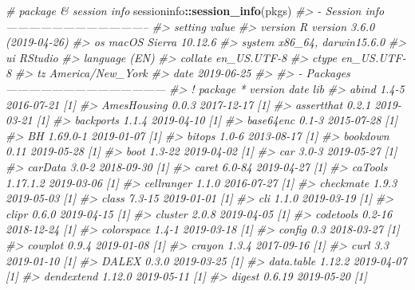 \documentclass[]{krantz}
\makeatletter
\newenvironment{Shaded}{\begin{snugshade}}{\end{snugshade}}
\newcommand{\CommentTok}[1]{\textcolor[rgb]{0.37,0.37,0.37}{\textit{#1}}}
\newcommand{\KeywordTok}[1]{\textcolor[rgb]{0.27,0.27,0.27}{\textbf{#1}}}
\newcommand{\NormalTok}[1]{#1}
\newcommand{\OperatorTok}[1]{\textcolor[rgb]{0.43,0.43,0.43}{\textbf{#1}}}
\newenvironment{kframe}{%
\medskip{}
\setlength{\fboxsep}{.8em}
 \def\at@end@of@kframe{}%
 \ifinner\ifhmode%
  \def\at@end@of@kframe{\end{minipage}}%
  \begin{minipage}{\columnwidth}%
 \fi\fi%
 \def\FrameCommand##1{\hskip\@totalleftmargin \hskip-\fboxsep
 \colorbox{shadecolor}{##1}\hskip-\fboxsep
     \hskip-\linewidth \hskip-\@totalleftmargin \hskip\columnwidth}%
 \MakeFramed {\advance\hsize-\width
   \@totalleftmargin\z@ \linewidth\hsize
   \@setminipage}}%
 {\par\unskip\endMakeFramed%
 \at@end@of@kframe}
\renewenvironment{Shaded}{\begin{kframe}}{\end{kframe}}
\makeatother
\begin{document}
\begin{Shaded}
\begin{Highlighting}[]
\CommentTok{# package & session info}
\NormalTok{sessioninfo}\OperatorTok{::}\KeywordTok{session_info}\NormalTok{(pkgs)}
\CommentTok{#> - Session info --------------------------------------}
\CommentTok{#>  setting  value                       }
\CommentTok{#>  version  R version 3.6.0 (2019-04-26)}
\CommentTok{#>  os       macOS Sierra 10.12.6        }
\CommentTok{#>  system   x86_64, darwin15.6.0        }
\CommentTok{#>  ui       RStudio                     }
\CommentTok{#>  language (EN)                        }
\CommentTok{#>  collate  en_US.UTF-8                 }
\CommentTok{#>  ctype    en_US.UTF-8                 }
\CommentTok{#>  tz       America/New_York            }
\CommentTok{#>  date     2019-06-25                  }
\CommentTok{#> }
\CommentTok{#> - Packages ------------------------------------------}
\CommentTok{#>  ! package       * version    date       lib}
\CommentTok{#>    abind           1.4-5      2016-07-21 [1]}
\CommentTok{#>    AmesHousing     0.0.3      2017-12-17 [1]}
\CommentTok{#>    assertthat      0.2.1      2019-03-21 [1]}
\CommentTok{#>    backports       1.1.4      2019-04-10 [1]}
\CommentTok{#>    base64enc       0.1-3      2015-07-28 [1]}
\CommentTok{#>    BH              1.69.0-1   2019-01-07 [1]}
\CommentTok{#>    bitops          1.0-6      2013-08-17 [1]}
\CommentTok{#>    bookdown        0.11       2019-05-28 [1]}
\CommentTok{#>    boot            1.3-22     2019-04-02 [1]}
\CommentTok{#>    car             3.0-3      2019-05-27 [1]}
\CommentTok{#>    carData         3.0-2      2018-09-30 [1]}
\CommentTok{#>    caret           6.0-84     2019-04-27 [1]}
\CommentTok{#>    caTools         1.17.1.2   2019-03-06 [1]}
\CommentTok{#>    cellranger      1.1.0      2016-07-27 [1]}
\CommentTok{#>    checkmate       1.9.3      2019-05-03 [1]}
\CommentTok{#>    class           7.3-15     2019-01-01 [1]}
\CommentTok{#>    cli             1.1.0      2019-03-19 [1]}
\CommentTok{#>    clipr           0.6.0      2019-04-15 [1]}
\CommentTok{#>    cluster         2.0.8      2019-04-05 [1]}
\CommentTok{#>    codetools       0.2-16     2018-12-24 [1]}
\CommentTok{#>    colorspace      1.4-1      2019-03-18 [1]}
\CommentTok{#>    config          0.3        2018-03-27 [1]}
\CommentTok{#>    cowplot         0.9.4      2019-01-08 [1]}
\CommentTok{#>    crayon          1.3.4      2017-09-16 [1]}
\CommentTok{#>    curl            3.3        2019-01-10 [1]}
\CommentTok{#>    DALEX           0.3.0      2019-03-25 [1]}
\CommentTok{#>    data.table      1.12.2     2019-04-07 [1]}
\CommentTok{#>    dendextend      1.12.0     2019-05-11 [1]}
\CommentTok{#>    digest          0.6.19     2019-05-20 [1]}

\end{Highlighting}
\end{Shaded}
\end{document}

